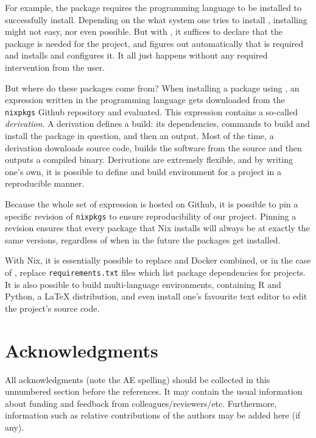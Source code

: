 \documentclass[
  article]{jss}
\begin{document}
For example, the   package requires the
 programming language to be installed to successfully
install. Depending on the what system one tries to install ,
installing  might not easy, nor even possible. But with
, it suffices to declare that the  package is
needed for the project, and  figures out automatically
that  is required and installs and configures it. It all
just happens without any required intervention from the user.

But where do these packages come from? When installing a package using
, an expression written in the  programming
language gets downloaded from the \texttt{nixpkgs} Github repository and
evaluated. This expression contains a so-called \emph{derivation}. A
derivation defines a build: its dependencies, commands to build and
install the package in question, and then an output. Most of the time, a
derivation downloads source code, builds the software from the source
and then outputs a compiled binary. Derivations are extremely flexible,
and by writing one's own, it is possible to define and build environment
for a project in a reproducible manner.

Because the whole set of  expression is hosted on Github,
it is possible to pin a specific revision of \texttt{nixpkgs} to ensure
reproducibility of our project. Pinning a revision ensures that every
package that Nix installs will always be at exactly the same versions,
regardless of when in the future the packages get installed.

With Nix, it is essentially possible to replace  and Docker
combined, or in the case of , replace
\texttt{requirements.txt} files which list package dependencies for
 projects. It is also possible to build multi-language
environments, containing R and Python, a LaTeX distribution, and even
install one's favourite text editor to edit the project's source code.

\section*{Acknowledgments}\label{acknowledgments}

\begin{tcolorbox}[enhanced jigsaw, breakable, left=2mm, rightrule=.15mm, arc=.35mm, leftrule=.75mm, toprule=.15mm, bottomrule=.15mm, colback=white, opacityback=0]

All acknowledgments (note the AE spelling) should be collected in this
unnumbered section before the references. It may contain the usual
information about funding and feedback from colleagues/reviewers/etc.
Furthermore, information such as relative contributions of the authors
may be added here (if any).

\end{tcolorbox}
\end{document}
